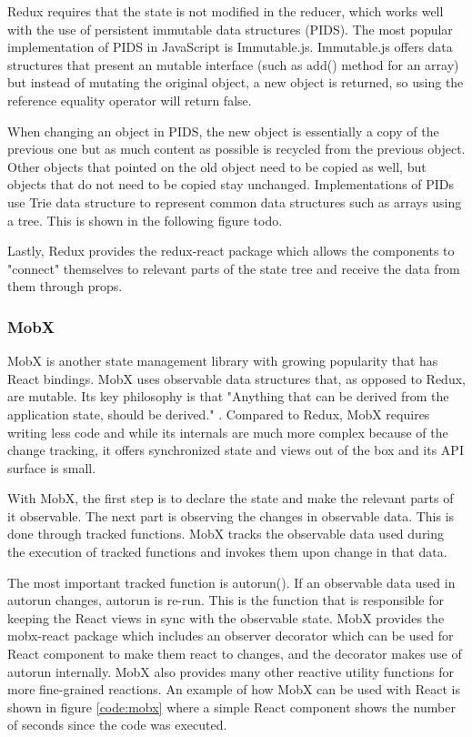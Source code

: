 Redux requires that the state is not modified in the reducer, which works well with the use of persistent immutable data structures \cite{redux:intro} (PIDS). The most popular implementation of PIDS in JavaScript is Immutable.js. Immutable.js offers data structures that present an mutable interface (such as add() method for an array) but instead of mutating the original object, a new object is returned, so using the reference equality operator will return false. 

When changing an object in PIDS, the new object is essentially a copy of the previous one but as much content as possible is recycled from the previous object. Other objects that pointed on the old object need to be copied as well, but objects that do not need to be copied stay unchanged. Implementations of PIDs use Trie data structure to represent common data structures such as arrays using a tree. This is shown in the following figure todo. 

Lastly, Redux provides the redux-react package which allows the components to "connect" themselves to relevant parts of the state tree and receive the data from them through props.


\subsubsection{MobX}

MobX is another state management library with growing popularity that has React bindings. MobX uses observable data structures that, as opposed to Redux, are mutable. Its key philosophy is that "Anything that can be derived from the application state, should be derived." \cite{mobx:intro}. Compared to Redux, MobX requires writing less code and while its internals are much more complex because of the change tracking, it offers synchronized state and views out of the box and its API surface is small.

With MobX, the first step is to declare the state and make the relevant parts of it observable. 
The next part is observing the changes in observable data. This is done through tracked functions. MobX tracks the observable data used during the execution of tracked functions and invokes them upon change in that data. 

The most important tracked function is autorun(). If an observable data used in autorun changes, autorun is re-run. This is the function that is responsible for keeping the React views in sync with the observable state. MobX provides the mobx-react package which includes an observer decorator which can be used for React component to make them react to changes, and the decorator makes use of autorun internally.
MobX also provides many other reactive utility functions for more fine-grained reactions. An example of how MobX can be used with React is shown in figure \ref{code:mobx} where a simple React component shows the number of seconds since the code was executed.


